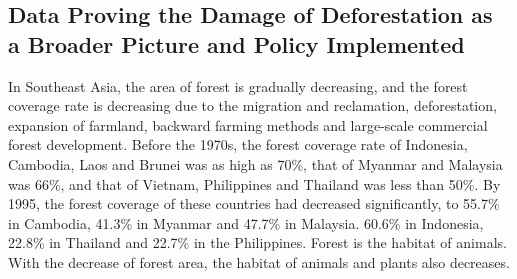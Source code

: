 \documentclass{book}\usepackage{knitr}
\begin{document}
\begin{knitrout}
\begin{kframe}
\section{Data Proving the Damage of Deforestation as a Broader Picture and Policy Implemented}
In Southeast Asia, the area of forest is gradually decreasing, and the forest coverage rate is decreasing due to the migration and reclamation, deforestation, expansion of farmland, backward farming methods and large-scale commercial forest development. Before the 1970s, the forest coverage rate of Indonesia, Cambodia, Laos and Brunei was as high as 70\%, that of Myanmar and Malaysia was 66\%, and that of Vietnam, Philippines and Thailand was less than 50\%. By 1995, the forest coverage of these countries had decreased significantly, to 55.7\% in Cambodia, 41.3\% in Myanmar and 47.7\% in Malaysia. 60.6\% in Indonesia, 22.8\% in Thailand and 22.7\% in the Philippines. Forest is the habitat of animals. With the decrease of forest area, the habitat of animals and plants also decreases.

\end{kframe}
\end{knitrout}
\end{document}
